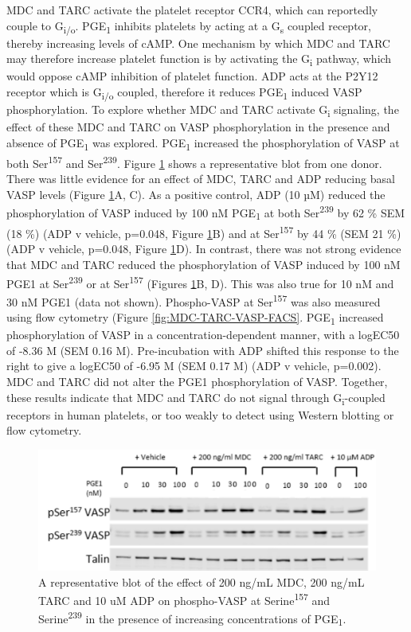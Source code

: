\documentclass[11pt,twoside]{bristolthesis}
\begin{document}
MDC and TARC activate the platelet receptor CCR4, which can reportedly couple to G\textsubscript{i/o}. PGE\textsubscript{1} inhibits platelets by acting at a G\textsubscript{s} coupled receptor, thereby increasing levels of cAMP. One mechanism by which MDC and TARC may therefore increase platelet function is by activating the G\textsubscript{i} pathway, which would oppose cAMP inhibition of platelet function. ADP acts at the P2Y12 receptor which is G\textsubscript{i/o} coupled, therefore it reduces PGE\textsubscript{1} induced VASP phosphorylation. To explore whether MDC and TARC activate G\textsubscript{i} signaling, the effect of these MDC and TARC on VASP phosphorylation in the presence and absence of PGE\textsubscript{1} was explored. PGE\textsubscript{1} increased the phosphorylation of VASP at both Ser\textsuperscript{157} and Ser\textsuperscript{239}. Figure \ref{fig:MDC-TARC-wp-WB-VASP} shows a representative blot from one donor. There was little evidence for an effect of MDC, TARC and ADP reducing basal VASP levels (Figure \ref{fig:MDC-TARC-wp-WB-VASP}A, C). As a positive control, ADP (10 µM) reduced the phosphorylation of VASP induced by 100 nM PGE\textsubscript{1} at both Ser\textsuperscript{239} by 62 \% SEM (18 \%) (ADP v vehicle, p=0.048, Figure \ref{fig:MDC-TARC-wp-WB-VASP}B) and at Ser\textsuperscript{157} by 44 \% (SEM 21 \%) (ADP v vehicle, p=0.048, Figure \ref{fig:MDC-TARC-wp-WB-VASP}D). In contrast, there was not strong evidence that MDC and TARC reduced the phosphorylation of VASP induced by 100 nM PGE1 at Ser\textsuperscript{239} or at Ser\textsuperscript{157} (Figures \ref{fig:MDC-TARC-wp-WB-VASP}B, D). This was also true for 10 nM and 30 nM PGE1 (data not shown). Phospho-VASP at Ser\textsuperscript{157} was also measured using flow cytometry (Figure \ref{fig:MDC-TARC-VASP-FACS}. PGE\textsubscript{1} increased phosphorylation of VASP in a concentration-dependent manner, with a logEC50 of -8.36 M (SEM 0.16 M). Pre-incubation with ADP shifted this response to the right to give a logEC50 of -6.95 M (SEM 0.17 M) (ADP v vehicle, p=0.002). MDC and TARC did not alter the PGE1 phosphorylation of VASP. Together, these results indicate that MDC and TARC do not signal through G\textsubscript{i}-coupled receptors in human platelets, or too weakly to detect using Western blotting or flow cytometry.



\begin{figure}
\includegraphics[width=0.6\linewidth]{figure/Chemokines/MDC_TARC_VASP_blot} \caption[A representative blot of the effect of MDC, TARC and ADP on PGE\textsubscript{1} stimulated phospho-VASP.]{A representative blot of the effect of 200 ng/mL MDC, 200 ng/mL TARC and 10 uM ADP on phospho-VASP at Serine\textsuperscript{157} and Serine\textsuperscript{239} in the presence of increasing concentrations of PGE\textsubscript{1}.}\label{fig:MDC-TARC-wp-WB-VASP}
\end{figure}
\end{document}
